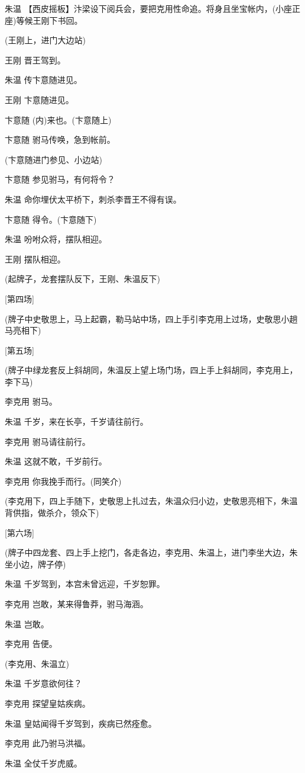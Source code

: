 朱温
【西皮摇板】汴梁设下阅兵会，要把克用性命追。将身且坐宝帐内，(小座正座)等候王刚下书回。

(王刚上，进门大边站)

王刚 晋王驾到。

朱温 传卞意随进见。

王刚 卞意随进见。

卞意随 (内)来也。(卞意随上)

卞意随 驸马传唤，急到帐前。

(卞意随进门参见、小边站)

卞意随 参见驸马，有何将令？

朱温 命你埋伏太平桥下，刺杀李晋王不得有误。

卞意随 得令。(卞意随下)

朱温 吩咐众将，摆队相迎。

王刚 摆队相迎。

(起牌子，龙套摆队反下，王刚、朱温反下)

{[}第四场{]}

(牌子中史敬思上，马上起霸，勒马站中场，四上手引李克用上过场，史敬思小趟马亮相下)

{[}第五场{]}

(牌子中绿龙套反上斜胡同，朱温反上望上场门场，四上手上斜胡同，李克用上，李下马)

李克用 驸马。

朱温 千岁，来在长亭，千岁请往前行。

李克用 驸马请往前行。

朱温 这就不敢，千岁前行。

李克用 你我挽手而行。(同笑介)

(李克用下，四上手随下，史敬思上扎过去，朱温众归小边，史敬思亮相下，朱温背供指，做杀介，领众下)

{[}第六场{]}

(牌子中四龙套、四上手上挖门，各走各边，李克用、朱温上，进门李坐大边，朱坐小边，牌子停)

朱温 千岁驾到，本宫未曾远迎，千岁恕罪。

李克用 岂敢，某来得鲁莽，驸马海涵。

朱温 岂敢。

李克用 告便。

(李克用、朱温立)

朱温 千岁意欲何往？

李克用 探望皇姑疾病。

朱温 皇姑闻得千岁驾到，疾病已然痊愈。

李克用 此乃驸马洪福。

朱温 全仗千岁虎威。


